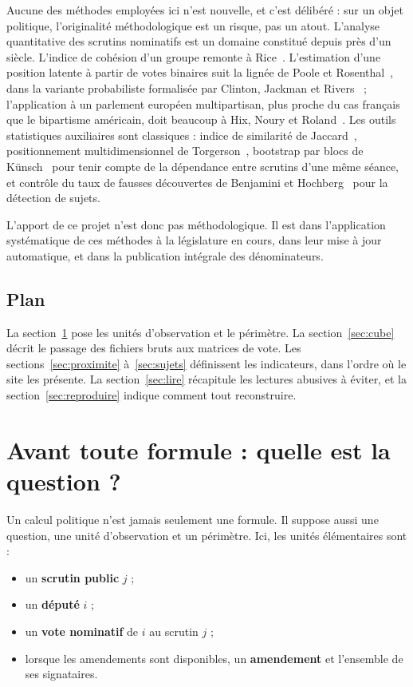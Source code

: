 \documentclass[11pt,a4paper]{article}
\begin{document}
Aucune des méthodes employées ici n'est nouvelle, et c'est délibéré : sur un
objet politique, l'originalité méthodologique est un risque, pas un atout.
L'analyse quantitative des scrutins nominatifs est un domaine constitué depuis
près d'un siècle. L'indice de cohésion d'un groupe remonte à
Rice~\cite{rice1928}. L'estimation d'une position latente à partir de votes
binaires suit la lignée de Poole et Rosenthal~\cite{poole1985,poole1997}, dans
la variante probabiliste formalisée par Clinton, Jackman et
Rivers~\cite{clinton2004} ; l'application à un parlement européen
multipartisan, plus proche du cas français que le bipartisme américain, doit
beaucoup à Hix, Noury et Roland~\cite{hix2006}. Les outils statistiques
auxiliaires sont classiques : indice de similarité de Jaccard~\cite{jaccard1901},
positionnement multidimensionnel de Torgerson~\cite{torgerson1952}, bootstrap
par blocs de Künsch~\cite{kunsch1989} pour tenir compte de la dépendance entre
scrutins d'une même séance, et contrôle du taux de fausses découvertes de
Benjamini et Hochberg~\cite{benjamini1995} pour la détection de sujets.

L'apport de ce projet n'est donc pas méthodologique. Il est dans l'application
systématique de ces méthodes à la législature en cours, dans leur mise à jour
automatique, et dans la publication intégrale des dénominateurs.

\subsection{Plan}

La section~\ref{sec:question} pose les unités d'observation et le périmètre.
La section~\ref{sec:cube} décrit le passage des fichiers bruts aux matrices de
vote. Les sections~\ref{sec:proximite} à~\ref{sec:sujets} définissent les
indicateurs, dans l'ordre où le site les présente. La
section~\ref{sec:lire} récapitule les lectures abusives à éviter, et la
section~\ref{sec:reproduire} indique comment tout reconstruire.

\section{Avant toute formule : quelle est la question ?}\label{sec:question}

Un calcul politique n'est jamais seulement une formule. Il suppose aussi une
question, une unité d'observation et un périmètre. Ici, les unités élémentaires
sont :

\begin{itemize}
  \item un \textbf{scrutin public} $j$ ;
  \item un \textbf{député} $i$ ;
  \item un \textbf{vote nominatif} de $i$ au scrutin $j$ ;
  \item lorsque les amendements sont disponibles, un \textbf{amendement} et
  l'ensemble de ses signataires.
\end{itemize}
\end{document}
